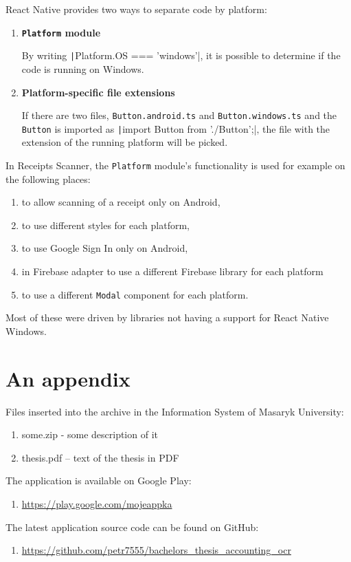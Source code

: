 \documentclass[
  digital, %
  table,   %
  oneside, %
  lof,     %
  lot,     %
]{fithesis3}
\newcommand{\code}[1]{\texttt|#1|} %
\begin{document}
React Native provides two ways to separate code by platform:
\begin{enumerate}
\item \textbf{\texttt{Platform} module}
    
    By writing \code{Platform.OS === 'windows'}, it is possible to determine if the code is running on Windows.
\item \textbf{Platform-specific file extensions}

    If there are two files, \texttt{Button.android.ts} and \texttt{Button.windows.ts} and the \texttt{Button} is imported as \code{import Button from './Button';}‚ the file with the extension of the running platform will be picked.
\end{enumerate}

In Receipts Scanner, the \texttt{Platform} module's functionality is used for example on the following places:
\begin{enumerate}
    \item to allow scanning of a receipt only on Android,
    \item to use different styles for each platform,
    \item to use Google Sign In only on Android,
    \item in Firebase adapter to use a different Firebase library for each platform 
    \item to use a different \texttt{Modal} component for each platform.
\end{enumerate}
Most of these were driven by libraries not having a support for React Native Windows.


  \makeatletter\thesis@blocks@clear\makeatother
  \printindex



\appendix %
\chapter{An appendix}
Files inserted into the archive in the Information System of Masaryk
University:
\begin{enumerate}
\item some.zip - some description of it
\item thesis.pdf – text of the thesis in PDF
\end{enumerate}

The application is available on Google Play:
\begin{enumerate}
\item \url{https://play.google.com/mojeappka}
\end{enumerate}

The latest application source code can be found on GitHub:
\begin{enumerate}
\item \url{https://github.com/petr7555/bachelors_thesis_accounting_ocr}
\end{enumerate}
\end{document}
